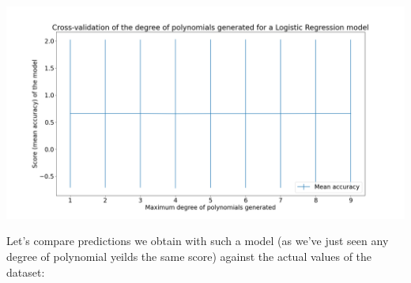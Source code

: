 \documentclass[10pt]{article}
\begin{document}
\begin{center}
    \includegraphics[scale=0.25]{ds_2_degree_cv.png}
\end{center}
\vspace{5mm} %

Let's compare predictions we obtain with such a model (as we've just seen any degree of polynomial yeilds
the same score) against the actual values of the dataset:

\begin{figure}[H]    
\end{figure}
\end{document}
